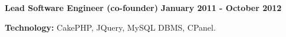 \begin{outerlist}
\item[\FA \faAngleDoubleRight] \textbf{Lead Software Engineer (co-founder)}
\hfill \textbf{January 2011 - October 2012}
\end{outerlist}

    \begin{innerlist}
\item \textbf{Technology:} CakePHP, JQuery, MySQL DBMS, CPanel.
    \end{innerlist}





%

% 


